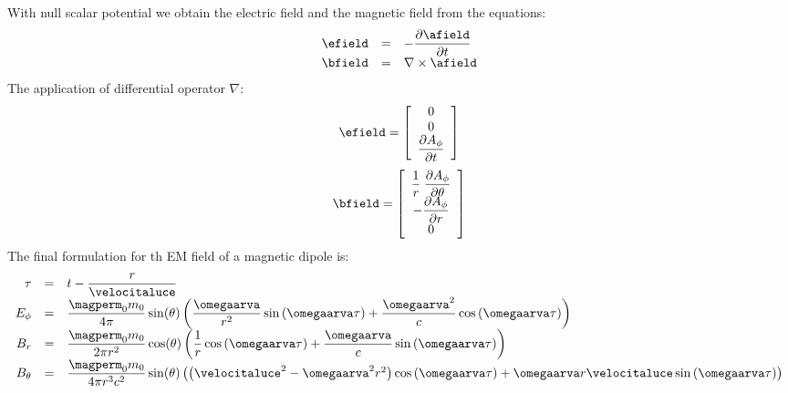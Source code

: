 With null scalar potential we obtain the electric field and the magnetic field from the equations:
\begin{equation}
\begin{array}{rcl}
\efield & = & - \partialtarg{\afield} \\
\bfield & = & \nabla\times\afield 
\end{array}
\end{equation}
The application of differential operator $\nabla$:
\begin{equation}
\efield = \left[ \begin{array}{c} 0 \\ 0 \\ \partialtarg{A_{\phi}} \end{array} \right]
\end{equation}
\begin{equation}
\bfield = \left[ \begin{array}{c} \dfrac{1}{r}\;\dfrac{\partial A_{\phi}}{\partial \theta} \\ - \dfrac{\partial A_{\phi}}{\partial r} \\ 0 \end{array} \right]
\end{equation}
The final formulation for th EM field of a magnetic dipole is:
\begin{equation}
\begin{array}{rcl}
\label{eq:campidef1}
\tau & = &  t - \dfrac{r}{\velocitaluce} \\
E_{\phi} & = & \dfrac{\magperm_0 m_0}{4\pi}\sin(\theta)\left( \dfrac{\omegaarva}{r^2}\sin\left( \omegaarva\tau \right) + \dfrac{\omegaarva^2}{c}\cos\left( \omegaarva\tau \right) \right) \\
B_{r} & = & \dfrac{\magperm_0 m_0}{2\pi r^2}\cos(\theta)\left( \dfrac{1}{r}\cos\left( \omegaarva\tau \right) + \dfrac{\omegaarva}{c}\sin\left( \omegaarva\tau \right) \right) \\
B_{\theta} & = & \dfrac{\magperm_0 m_0}{4 \pi r^3 c^2}\sin(\theta)\left( \left( \velocitaluce^2 - \omegaarva^2 r^2 \right)\cos\left( \omegaarva\tau \right) + \omegaarva r \velocitaluce \sin\left( \omegaarva\tau \right) \right) 
\end{array}
\end{equation}

